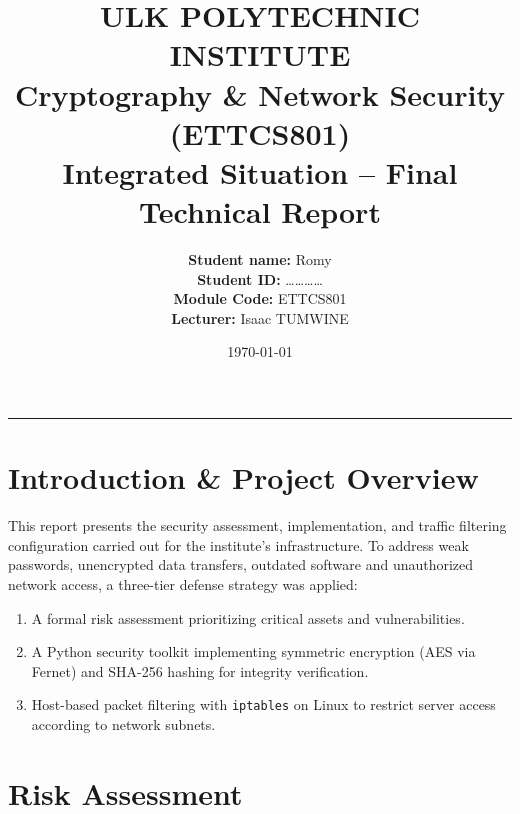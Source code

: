 \documentclass[11pt,a4paper]{article}
\title{\textbf{ULK POLYTECHNIC INSTITUTE}\\
       \Large Cryptography \& Network Security (ETTCS801)\\
       \large Integrated Situation -- Final Technical Report}
\author{\textbf{Student name:} Romy \\
        \textbf{Student ID:} \dots\dots\dots\dots \\
        \textbf{Module Code:} ETTCS801 \\
        \textbf{Lecturer:} Isaac TUMWINE}
\date{\today}
\begin{document}
\maketitle
\hrule
\vspace{0.5cm}

\section{Introduction \& Project Overview}
This report presents the security assessment, implementation, and traffic
filtering configuration carried out for the institute's infrastructure.
To address weak passwords, unencrypted data transfers, outdated software
and unauthorized network access, a three-tier defense strategy was applied:

\begin{enumerate}
  \item A formal risk assessment prioritizing critical assets and vulnerabilities.
  \item A Python security toolkit implementing symmetric encryption (AES via
        Fernet) and SHA-256 hashing for integrity verification.
  \item Host-based packet filtering with \texttt{iptables} on Linux to restrict
        server access according to network subnets.
\end{enumerate}

\section{Risk Assessment}
\end{document}
